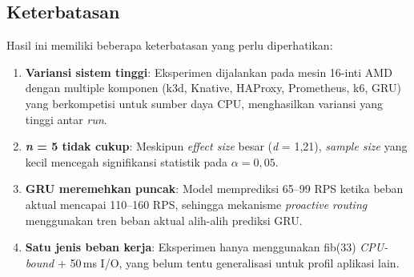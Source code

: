 \subsection{Keterbatasan}

Hasil ini memiliki beberapa keterbatasan yang perlu diperhatikan:

\begin{enumerate}
    \item \textbf{Variansi sistem tinggi}: Eksperimen dijalankan pada mesin 16-inti AMD dengan multiple komponen (k3d, Knative, HAProxy, Prometheus, k6, GRU) yang berkompetisi untuk sumber daya CPU, menghasilkan variansi yang tinggi antar \emph{run}.
    \item \textbf{\emph{n} = 5 tidak cukup}: Meskipun \emph{effect size} besar (\emph{d} = 1,21), \emph{sample size} yang kecil mencegah signifikansi statistik pada $\alpha = 0,05$.
    \item \textbf{GRU meremehkan puncak}: Model memprediksi 65--99 RPS ketika beban aktual mencapai 110--160 RPS, sehingga mekanisme \emph{proactive routing} menggunakan tren beban aktual alih-alih prediksi GRU.
    \item \textbf{Satu jenis beban kerja}: Eksperimen hanya menggunakan fib(33) \emph{CPU-bound} + 50\,ms I/O, yang belum tentu generalisasi untuk profil aplikasi lain.
\end{enumerate}
